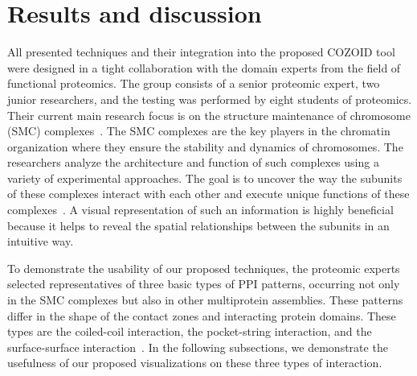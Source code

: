 \documentclass{bmcart}
\def\MatView {Matrix view\xspace}
\begin{document}

\section*{Results and discussion}
All presented techniques and their integration into the proposed COZOID tool were designed in a tight collaboration with the domain experts from the field of functional proteomics.
The group consists of a senior proteomic expert, two junior researchers, and the testing was performed by eight students of proteomics.
Their current main research focus is on the structure maintenance of chromosome (SMC) complexes~\cite{Palecek2015}. 
The SMC complexes are the key players in the chromatin organization where they ensure the stability and dynamics of chromosomes. 
The researchers analyze the architecture and function of such complexes using a variety of experimental approaches. 
The goal is to uncover the way the subunits of these complexes interact with each other and execute unique functions of these complexes~\cite{Gligoris}. 
A visual representation of such an information is highly beneficial because it helps to reveal the spatial relationships between the subunits in an intuitive way.

To demonstrate the usability of our proposed techniques, the proteomic experts selected representatives of three basic types of PPI patterns, occurring not only in the SMC complexes but also in other multiprotein assemblies. 
These patterns differ in the shape of the contact zones and interacting protein domains.
These types are the coiled-coil interaction, the pocket-string interaction, and the surface-surface interaction~\cite{alberts02molecular}.
In the following subsections, we demonstrate the usefulness of our proposed visualizations on these three types of interaction.
\end{document}
